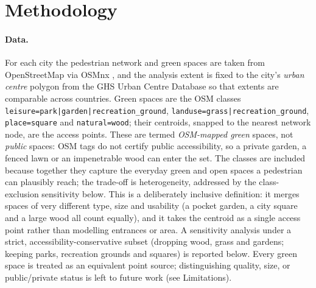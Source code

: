 \documentclass[sn-mathphys-num,pdflatex]{sn-jnl}
\begin{document}
\section{Methodology}\label{sec:method}
\paragraph{Data.} For each city the pedestrian network and green spaces are taken
from OpenStreetMap via OSMnx \citep{boeing2017osmnx}, and the
analysis extent is fixed to the city's \emph{urban centre} polygon from the GHS Urban
Centre Database \citep{ghsl2019ucdb} so that extents are comparable across
countries. Green spaces are the OSM classes \texttt{leisure=park|garden|recreation\_ground},
\texttt{landuse=grass|recreation\_ground}, \texttt{place=square} and
\texttt{natural=wood}; their centroids, snapped to the nearest network node, are
the access points. These are termed \emph{OSM-mapped green} spaces, not \emph{public}
spaces: OSM tags do not certify public accessibility, so a private garden, a fenced
lawn or an impenetrable wood can enter the set. The classes are included because
together they capture the everyday green and open spaces a pedestrian can plausibly
reach; the trade-off is heterogeneity, addressed by the class-exclusion sensitivity
below. This is a deliberately inclusive definition: it
merges spaces of very different type, size and usability (a pocket garden, a city
square and a large wood all count equally), and it takes the centroid as a single
access point rather than modelling entrances or area. A sensitivity analysis under a
strict, accessibility-conservative subset (dropping wood, grass and gardens; keeping
parks, recreation grounds and squares) is reported below. Every green space is treated
as an equivalent point source; distinguishing quality, size, or public/private status
is left to future work (see Limitations).
\end{document}
